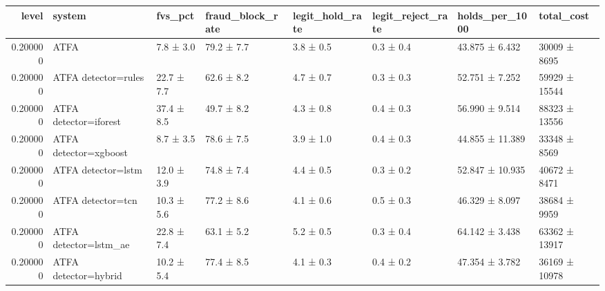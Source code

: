 \begin{tabular}{rlllllll}
\toprule
level & system & fvs\_pct & fraud\_block\_rate & legit\_hold\_rate & legit\_reject\_rate & holds\_per\_1000 & total\_cost \\
\midrule
0.200000 & ATFA & 7.8 ± 3.0 & 79.2 ± 7.7 & 3.8 ± 0.5 & 0.3 ± 0.4 & 43.875 ± 6.432 & 30009 ± 8695 \\
0.200000 & ATFA detector=rules & 22.7 ± 7.7 & 62.6 ± 8.2 & 4.7 ± 0.7 & 0.3 ± 0.3 & 52.751 ± 7.252 & 59929 ± 15544 \\
0.200000 & ATFA detector=iforest & 37.4 ± 8.5 & 49.7 ± 8.2 & 4.3 ± 0.8 & 0.4 ± 0.3 & 56.990 ± 9.514 & 88323 ± 13556 \\
0.200000 & ATFA detector=xgboost & 8.7 ± 3.5 & 78.6 ± 7.5 & 3.9 ± 1.0 & 0.4 ± 0.3 & 44.855 ± 11.389 & 33348 ± 8569 \\
0.200000 & ATFA detector=lstm & 12.0 ± 3.9 & 74.8 ± 7.4 & 4.4 ± 0.5 & 0.3 ± 0.2 & 52.847 ± 10.935 & 40672 ± 8471 \\
0.200000 & ATFA detector=tcn & 10.3 ± 5.6 & 77.2 ± 8.6 & 4.1 ± 0.6 & 0.5 ± 0.3 & 46.329 ± 8.097 & 38684 ± 9959 \\
0.200000 & ATFA detector=lstm\_ae & 22.8 ± 7.4 & 63.1 ± 5.2 & 5.2 ± 0.5 & 0.3 ± 0.4 & 64.142 ± 3.438 & 63362 ± 13917 \\
0.200000 & ATFA detector=hybrid & 10.2 ± 5.4 & 77.4 ± 8.5 & 4.1 ± 0.3 & 0.4 ± 0.2 & 47.354 ± 3.782 & 36169 ± 10978 \\
\bottomrule
\end{tabular}
